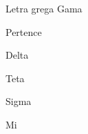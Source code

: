 \begin{simbolos}
  \item[$ \gamma $] Letra grega Gama
  \item[$ \in $] Pertence
  \item[$ \delta$] Delta
  \item[$ \theta$] Teta
  \item[$ \sigma$] Sigma
  \item[$ \mu$] Mi
\end{simbolos}
